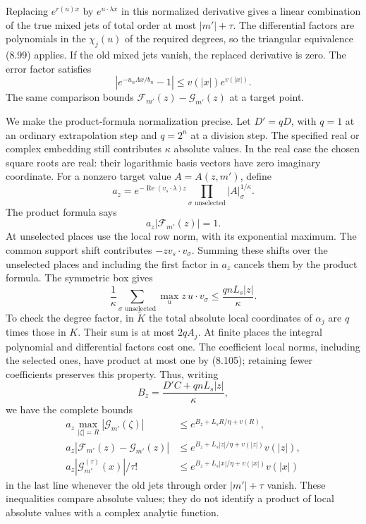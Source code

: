 \documentclass[
  11pt,
  a4paper,
]{article}
\begin{document}
Replacing \(e^{r(u)x}\) by \(e^{u\cdot\lambda x}\) in this normalized
derivative gives a linear combination of the true mixed jets of total
order at most \(|m'|+\tau\). The differential factors are polynomials in
the \(\chi_j(u)\) of the required degrees, so the triangular equivalence
(8.99) applies. If the old mixed jets vanish, the replaced derivative is
zero. The error factor satisfies \[
\left|e^{-u_n\Lambda x/b_n}-1\right|
\le v(|x|)e^{v(|x|)}.
\] The same comparison bounds \(\mathcal F_{m'}(z)-\mathcal G_{m'}(z)\)
at a target point.

We make the product-formula normalization precise. Let \(D'=qD\), with
\(q=1\) at an ordinary extrapolation step and \(q=2^n\) at a division
step. The specified real or complex embedding still contributes
\(\kappa\) absolute values. In the real case the chosen square roots are
real: their logarithmic basis vectors have zero imaginary coordinate.
For a nonzero target value \(A=A(z,m')\), define \[
a_z=e^{-\operatorname{Re}(v_s\cdot\lambda)z}
\prod_{\sigma\text{ unselected}}|A|_\sigma^{1/\kappa}.
\] The product formula says \[
a_z|\mathcal F_{m'}(z)|=1.
\] At unselected places use the local row norm, with its exponential
maximum. The common support shift contributes \(-zv_s\cdot v_\sigma\).
Summing these shifts over the unselected places and including the first
factor in \(a_z\) cancels them by the product formula. The symmetric box
gives \[
\frac1\kappa\sum_{\sigma\text{ unselected}}
\max_u z\,u\cdot v_\sigma
\le\frac{qnL_s|z|}{\kappa}.
\] To check the degree factor, in \(\widetilde K\) the total absolute
local coordinates of \(\alpha_j\) are \(q\) times those in \(K\). Their
sum is at most \(2qA_j\). At finite places the integral polynomial and
differential factors cost one. The coefficient local norms, including
the selected ones, have product at most one by (8.105); retaining fewer
coefficients preserves this property. Thus, writing \[
B_z=\frac{D'C+qnL_s|z|}{\kappa},
\] we have the complete bounds \[
\begin{aligned}
a_z\max_{|\zeta|=R}|\mathcal G_{m'}(\zeta)|
&\le e^{B_z+L_sR/\eta+v(R)},\\
a_z|\mathcal F_{m'}(z)-\mathcal G_{m'}(z)|
&\le e^{B_z+L_s|z|/\eta+v(|z|)}v(|z|),\\
a_z|\mathcal G_{m'}^{(\tau)}(x)|/\tau!
&\le e^{B_z+L_s|x|/\eta+v(|x|)}v(|x|)
\end{aligned}
\tag{8.118}
\] in the last line whenever the old jets through order \(|m'|+\tau\)
vanish. These inequalities compare absolute values; they do not identify
a product of local absolute values with a complex analytic function.
\end{document}

